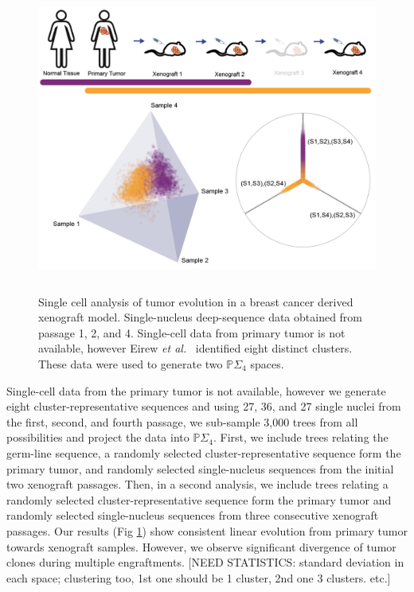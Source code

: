 \documentclass[a4paper,11pt]{article}
\begin{document}
\begin{figure}
    \centering
    \includegraphics[height=4in]{figures/xenograft_single_cell.png}
    \caption{Single cell analysis of tumor evolution in a breast cancer derived xenograft model. Single-nucleus deep-sequence data obtained from passage 1, 2, and 4. Single-cell data from primary tumor is not available, however  Eirew \textit{et al.}~\cite{eirew2014dynamics} identified eight distinct clusters. These data were used to generate two $\mathbb{P}\Sigma_4 $ spaces.}
    \label{fig:xenograft}
\end{figure} 

Single-cell data from the primary tumor is not available, however we generate eight cluster-representative sequences and using 27, 36, and 27 single nuclei from the first, second, and fourth passage, we sub-sample 3,000 trees from all possibilities and project the data into $\mathbb{P}\Sigma_4 $.
First, we include trees relating the germ-line sequence, a randomly selected cluster-representative sequence form the primary tumor, and randomly selected single-nucleus sequences from the initial two xenograft passages.
Then, in a second analysis, we include trees relating a randomly selected cluster-representative sequence form the primary tumor and randomly selected single-nucleus sequences from three consecutive xenograft passages.
Our results (Fig \ref{fig:xenograft}) show consistent linear evolution from primary tumor towards xenograft samples.
However, we observe significant divergence of tumor clones during multiple engraftments. [NEED STATISTICS: standard deviation in each space; clustering too, 1st one should be 1 cluster, 2nd one 3 clusters. etc.]
\end{document}
